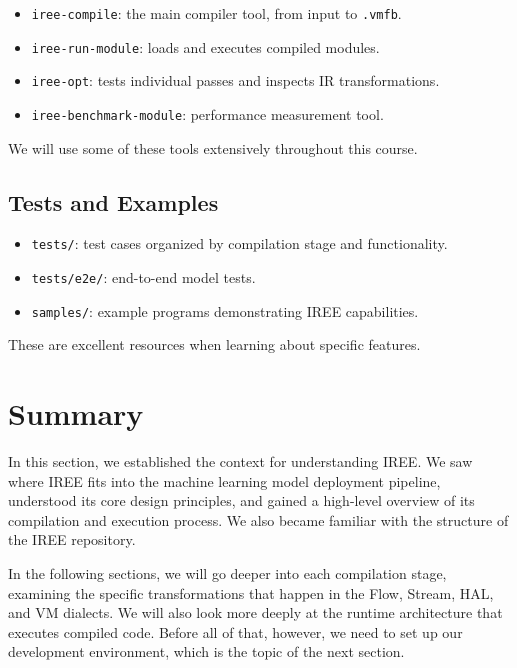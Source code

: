 \documentclass[11pt,a4paper]{article}
\begin{document}
\begin{itemize}
    \item \texttt{iree-compile}: the main compiler tool, from input to \texttt{.vmfb}.
    \item \texttt{iree-run-module}: loads and executes compiled modules.
    \item \texttt{iree-opt}: tests individual passes and inspects IR transformations.
    \item \texttt{iree-benchmark-module}: performance measurement tool.
\end{itemize}

We will use some of these tools extensively throughout this course.

\subsection{Tests and Examples}

\begin{itemize}
    \item \texttt{tests/}: test cases organized by compilation stage and functionality.
    \item \texttt{tests/e2e/}: end-to-end model tests.
    \item \texttt{samples/}: example programs demonstrating IREE capabilities.
\end{itemize}

These are excellent resources when learning about specific features.

\section{Summary}

In this section, we established the context for understanding IREE. We saw where IREE fits into the machine learning model deployment pipeline, understood its core design principles, and gained a high-level overview of its compilation and execution process. We also became familiar with the structure of the IREE repository.

In the following sections, we will go deeper into each compilation stage, examining the specific transformations that happen in the Flow, Stream, HAL, and VM dialects. We will also look more deeply at the runtime architecture that executes compiled code. Before all of that, however, we need to set up our development environment, which is the topic of the next section.
\end{document}
